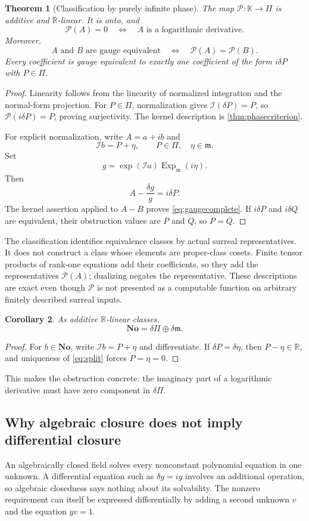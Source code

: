 \documentclass[11pt,letterpaper]{article}
\numberwithin{equation}{section}
\newtheorem{theorem}{Theorem}[section]
\newtheorem{corollary}[theorem]{Corollary}
\theoremstyle{definition}
\theoremstyle{remark}
\newcommand{\No}{\mathbf{No}}
\newcommand{\K}{\mathbb K}
\newcommand{\R}{\mathbb R}
\newcommand{\mm}{\mathfrak m}
\newcommand{\PP}{\Pi}
\newcommand{\Ex}{\operatorname{Exp}_{\mm}}
\newcommand{\Iop}{\mathcal I}
\newcommand{\Ob}{\mathcal P}
\begin{document}
\begin{theorem}[Classification by purely infinite phase]\label{thm:gauge}
The map $\Ob:\K\to\PP$ is additive and $\R$-linear. It is onto, and
\[
 \Ob(A)=0\quad\Longleftrightarrow\quad A\text{ is a logarithmic derivative}.
\]
Moreover,
\begin{equation}\label{eq:gaugecomplete}
 A\text{ and }B\text{ are gauge equivalent}
 \quad\Longleftrightarrow\quad\Ob(A)=\Ob(B).
\end{equation}
Every coefficient is gauge equivalent to exactly one coefficient of the form $i\delta P$ with $P\in\PP$.
\end{theorem}
\begin{proof}
Linearity follows from the linearity of normalized integration and the normal-form projection. For $P\in\PP$, normalization gives $\Iop(\delta P)=P$, so $\Ob(i\delta P)=P$, proving surjectivity. The kernel description is \cref{thm:phasecriterion}.

For explicit normalization, write $A=a+ib$ and
\[
 \Iop b=P+\eta,\qquad P\in\PP,\quad\eta\in\mm.
\]
Set
\[
 g=\exp(\Iop a)\Ex(i\eta).
\]
Then
\[
 A-\frac{\delta g}{g}=i\delta P.
\]
The kernel assertion applied to $A-B$ proves \eqref{eq:gaugecomplete}. If $i\delta P$ and $i\delta Q$ are equivalent, their obstruction values are $P$ and $Q$, so $P=Q$.
\end{proof}

The classification identifies equivalence classes by actual surreal representatives. It does not construct a class whose elements are proper-class cosets. Finite tensor products of rank-one equations add their coefficients, so they add the representatives $\Ob(A)$; dualizing negates the representative. These descriptions are exact even though $\Ob$ is not presented as a computable function on arbitrary finitely described surreal inputs.

\begin{corollary}\label{cor:derivdecomp}
As additive $\R$-linear classes,
\[
 \No=\delta\PP\oplus\delta\mm.
\]
\end{corollary}
\begin{proof}
For $b\in\No$, write $\Iop b=P+\eta$ and differentiate. If $\delta P=\delta\eta$, then $P-\eta\in\R$, and uniqueness of \eqref{eq:split} forces $P=\eta=0$.
\end{proof}
This makes the obstruction concrete: the imaginary part of a logarithmic derivative must have zero component in $\delta\PP$.

\subsection{Why algebraic closure does not imply differential closure}
An algebraically closed field solves every nonconstant polynomial equation in one unknown. A differential equation such as $\delta y=iy$ involves an additional operation, so algebraic closedness says nothing about its solvability. The nonzero requirement can itself be expressed differentially by adding a second unknown $v$ and the equation $yv=1$.
\end{document}
